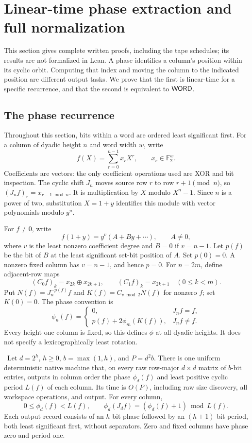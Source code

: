 \section{Linear-time phase extraction and full normalization}
\label{sec:phase}
This section gives complete written proofs, including the tape schedules;
its results are not formalized in Lean. A phase identifies a column's
position within its cyclic orbit. Computing that index and moving the
column to the indicated position are different output tasks. We prove
that the first is linear-time for a specific recurrence, and that the
second is equivalent to $\mathsf{WORD}$.

\subsection{The phase recurrence}
Throughout this section, bits within a word are ordered least significant
first. For a column of dyadic height $n$ and word width $w$, write
\[
 f(X)=\sum_{r=0}^{n-1}x_rX^r,\qquad x_r\in\mathbb F_2^w.
\]
Coefficients are vectors: the only coefficient operations used are XOR
and bit inspection. The cyclic shift $J_n$ moves source row $r$ to row
$r+1\pmod n$, so $(J_nf)_r=x_{r-1\bmod n}$. It is multiplication by
$X$ modulo $X^n-1$. Since $n$ is a power of two, substitution $X=1+y$
identifies this module with vector polynomials modulo $y^n$.

For $f\ne0$, write
\[
 f(1+y)=y^v(A+By+\cdots),\qquad A\ne0,
\]
where $v$ is the least nonzero coefficient degree and $B=0$ if $v=n-1$.
Let $p(f)$ be the bit of $B$ at the least significant set-bit position of
$A$. Set $p(0)=0$. A nonzero fixed column has $v=n-1$, and hence $p=0$.
For $n=2m$, define adjacent-row maps
\[
 (C_0f)_k=x_{2k}\mathbin\oplus x_{2k+1},\qquad
 (C_1f)_k=x_{2k+1}\quad(0\le k<m).
\]
Put $N(f)=J_n^{-p(f)}f$ and
$K(f)=C_{v\bmod2}N(f)$ for nonzero $f$; set $K(0)=0$.
The phase convention is
\begin{equation}\label{eq:phase-recurrence}
 \phi_n(f)=
 \begin{cases}
  0,&J_nf=f,\\
  p(f)+2\phi_m(K(f)),&J_nf\ne f.
 \end{cases}
\end{equation}
Every height-one column is fixed, so this defines $\phi$ at all dyadic
heights. It does not specify a lexicographically least rotation.

\begin{theorem}\label{thm:paid-phase}
\notformalized\ Let $d=2^h$, $h\ge0$, $b=\max(1,h)$, and $P=d^2b$.
There is one uniform deterministic native machine that, on every raw
row-major $d\times d$ matrix of $b$-bit entries, outputs in column order
the phase $\phi_d(f)$ and least positive cyclic period $L(f)$ of each
column. Its time is $O(P)$, including raw size discovery, all workspace
operations, and output. For every column,
\[
 0\le\phi_d(f)<L(f),\qquad
 \phi_d(J_df)=(\phi_d(f)+1)\bmod L(f).
\]
Each output record consists of an $h$-bit phase followed by an $(h+1)$-bit
period, both least significant first, without separators. Zero and fixed
columns have phase zero and period one.
\end{theorem}

